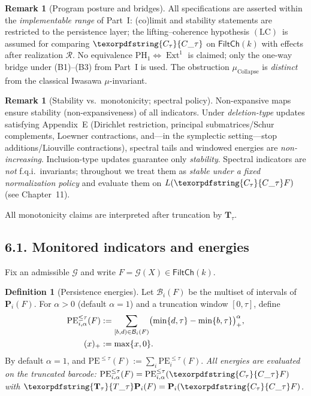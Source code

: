 \documentclass[11pt]{article}
\numberwithin{equation}{section}
\theoremstyle{plain}
\theoremstyle{definition}
\theoremstyle{remark}
\DeclareMathOperator{\Ext}{Ext}
\DeclareRobustCommand{\hyp}{\nobreakdash-}
\newcommand{\Rfun}{\mathcal{R}}
\theoremstyle{plain}
\theoremstyle{definition}
\numberwithin{equation}{section}
\theoremstyle{definition}
\newtheorem{definition}[theorem]{Definition}
\newtheorem{remark}[theorem]{Remark}
\DeclareRobustCommand{\FiltCh}[1]{\mathsf{FiltCh}(#1)}
\DeclareRobustCommand{\Ttau}{\texorpdfstring{\ensuremath{\mathbf{T}_{\tau}}}{T\_\tau}}
\DeclareRobustCommand{\Ctau}{\texorpdfstring{\ensuremath{C_{\tau}}}{C\_\tau}}
\DeclareRobustCommand{\muc}{\mu_{\mathrm{Collapse}}}
\DeclareRobustCommand{\LC}{\texorpdfstring{\ensuremath{\mathrm{(LC)}}}{(LC)}}
\numberwithin{equation}{section}
\theoremstyle{plain}
\theoremstyle{definition}
\theoremstyle{remark}
\providecommand{\Cfun}[1]{\mathsf{C}_{#1}}
\providecommand{\Tfun}[1]{\mathbf{T}_{#1}}
\providecommand{\Ctau}{\Cfun{\tau}}
\providecommand{\Ttau}{\Tfun{\tau}}
\providecommand{\muc}{\mu_{\mathrm{Collapse}}}
\providecommand{\n}{\unskip\space}
\begin{document}
\begin{remark}[Program posture and bridges]\label{rk:LC}
All specifications are asserted within the \emph{implementable range} of Part~I: (co)limit and stability statements are restricted to the persistence layer; the lifting–coherence hypothesis \LC\ is assumed for comparing \(\Ctau\) on \(\FiltCh{k}\) with effects after realization \(\Rfun\).
No equivalence \(\mathrm{PH}_1\Leftrightarrow\Ext^1\) is claimed; only the one\hyp way bridge under \textup{(B1)–(B3)} from Part~I is used.
The obstruction \(\muc\) is \emph{distinct} from the classical Iwasawa \(\mu\)\hyp invariant.
\end{remark}

\begin{remark}[Stability vs.\ monotonicity; spectral policy]\label{rem:stability-vs-monotonicity}
Non\hyp expansive maps ensure stability (non\hyp expansiveness) of all indicators.
Under \emph{deletion\hyp type} updates satisfying Appendix~E (Dirichlet restriction, principal submatrices/Schur complements, Loewner contractions, and—in the symplectic setting—stop additions/Liouville contractions), spectral tails and windowed energies are \emph{non\hyp increasing}. Inclusion\hyp type updates guarantee only \emph{stability}.
Spectral indicators are \emph{not} f.q.i.\ invariants; throughout we treat them as \emph{stable under a fixed normalization policy} and evaluate them on \(L(\Ctau F)\) (see Chapter~11).
\end{remark}

All monotonicity claims are interpreted after truncation by \Ttau.

\subsection*{6.1. Monitored indicators and energies}
Fix an admissible \(\mathcal{G}\) and write \(F=\mathcal{G}(X)\in \FiltCh{k}\).

\begin{definition}[Persistence energies]\label{def:PE}
Let \(\mathcal{B}_i(F)\) be the multiset of intervals of \(\mathbf{P}_i(F)\).
For \(\alpha>0\) (default \(\alpha=1\)) and a truncation window \([0,\tau]\), define
\begin{equation}\label{eq:PE-alpha-trunc}
\begin{aligned}
\mathrm{PE}_{i,\alpha}^{\le\tau}(F)
&:= \sum_{[b,d)\in \mathcal{B}_i(F)}
   \bigl(\min\{d,\tau\}-\min\{b,\tau\}\bigr)_{+}^{\alpha},\\\n(x)_{+}&:=\max\{x,0\}.
\end{aligned}
\end{equation}
By default \(\alpha=1\), and \(\mathrm{PE}^{\le\tau}(F):=\sum_i \mathrm{PE}_{i}^{\le\tau}(F)\).
\emph{All energies are evaluated on the truncated barcode: \(\mathrm{PE}_{i,\alpha}^{\le\tau}(F)=\mathrm{PE}_{i,\alpha}^{\le\tau}(\Ctau F)\) with \(\Ttau\mathbf{P}_i(F)=\mathbf{P}_i(\Ctau F)\).}
\end{definition}
\end{document}
